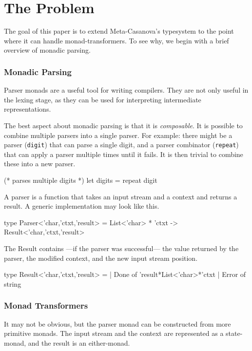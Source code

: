 \section{The Problem}
\begin{multicols}{2}\noindent
  The goal of this paper is to extend Meta-Casanova's typesystem to the point where it can handle monad-transformers.
  To see why, we begin with a brief overview of monadic parsing.
  
  \subsubsection*{Monadic Parsing}
  Parser monads are a useful tool for writing compilers.
  They are not only useful in the lexing stage,
  as they can be used for interpreting intermediate representations.

  The best aspect about monadic parsing is that it is \textit{composable}.
  It is possible to combine multiple parsers into a single parser.
  For example: there might be a parser (\texttt{digit}) that can parse a single digit,
  and a parser combinator (\texttt{repeat}) that can apply a parser multiple times until it fails.
  It is then trivial to combine these into a new parser.

  \begin{code}[language=Caml]
  (* parses multiple digits *)
  let digits = repeat digit
  \end{code}

  A parser is a function that takes an input stream and a context and returns a result.
  A generic implementation may look like this.

  \begin{code}[language=Caml]
  type Parser<'char,'ctxt,'result> =
    List<'char> * 'ctxt
      -> Result<'char,'ctxt,'result>
  \end{code}
  
  The Result contains ---if the parser was successful--- the value returned by the parser, the modified context, and the new input stream position.
  
  \begin{code}[language=Caml]
  type Result<'char,'ctxt,'result> = 
    | Done  of 'result*List<'char>*'ctxt
    | Error of string
  \end{code}

  \subsubsection*{Monad Transformers}
  It may not be obvious, but the parser monad can be constructed from more primitive monads.
  The input stream and the context are represented as a state-monad, and the result is an either-monad.


\end{multicols}
